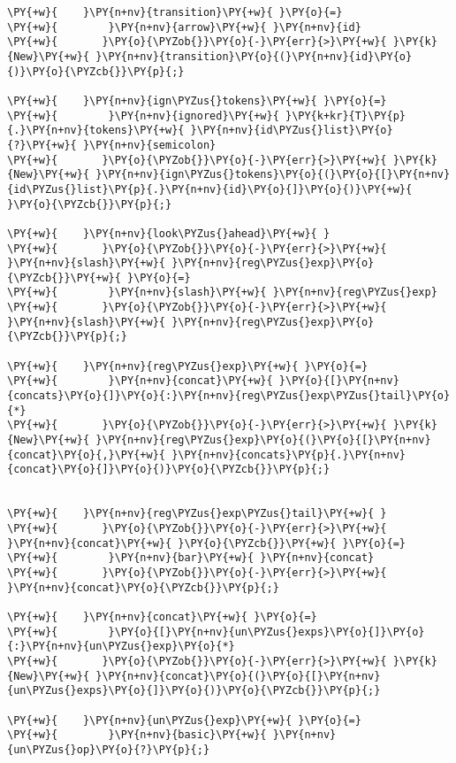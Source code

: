 \begin{Verbatim}[commandchars=\\\{\}]
\PY{+w}{    }\PY{n+nv}{transition}\PY{+w}{ }\PY{o}{=}
\PY{+w}{        }\PY{n+nv}{arrow}\PY{+w}{ }\PY{n+nv}{id}
\PY{+w}{	   }\PY{o}{\PYZob{}}\PY{o}{-}\PY{err}{>}\PY{+w}{ }\PY{k}{New}\PY{+w}{ }\PY{n+nv}{transition}\PY{o}{(}\PY{n+nv}{id}\PY{o}{)}\PY{o}{\PYZcb{}}\PY{p}{;}

\PY{+w}{    }\PY{n+nv}{ign\PYZus{}tokens}\PY{+w}{ }\PY{o}{=}
\PY{+w}{        }\PY{n+nv}{ignored}\PY{+w}{ }\PY{k+kr}{T}\PY{p}{.}\PY{n+nv}{tokens}\PY{+w}{ }\PY{n+nv}{id\PYZus{}list}\PY{o}{?}\PY{+w}{ }\PY{n+nv}{semicolon}
\PY{+w}{	   }\PY{o}{\PYZob{}}\PY{o}{-}\PY{err}{>}\PY{+w}{ }\PY{k}{New}\PY{+w}{ }\PY{n+nv}{ign\PYZus{}tokens}\PY{o}{(}\PY{o}{[}\PY{n+nv}{id\PYZus{}list}\PY{p}{.}\PY{n+nv}{id}\PY{o}{]}\PY{o}{)}\PY{+w}{ }\PY{o}{\PYZcb{}}\PY{p}{;}

\PY{+w}{    }\PY{n+nv}{look\PYZus{}ahead}\PY{+w}{ }
\PY{+w}{	   }\PY{o}{\PYZob{}}\PY{o}{-}\PY{err}{>}\PY{+w}{ }\PY{n+nv}{slash}\PY{+w}{ }\PY{n+nv}{reg\PYZus{}exp}\PY{o}{\PYZcb{}}\PY{+w}{ }\PY{o}{=}
\PY{+w}{        }\PY{n+nv}{slash}\PY{+w}{ }\PY{n+nv}{reg\PYZus{}exp}
\PY{+w}{	   }\PY{o}{\PYZob{}}\PY{o}{-}\PY{err}{>}\PY{+w}{ }\PY{n+nv}{slash}\PY{+w}{ }\PY{n+nv}{reg\PYZus{}exp}\PY{o}{\PYZcb{}}\PY{p}{;}

\PY{+w}{    }\PY{n+nv}{reg\PYZus{}exp}\PY{+w}{ }\PY{o}{=}
\PY{+w}{        }\PY{n+nv}{concat}\PY{+w}{ }\PY{o}{[}\PY{n+nv}{concats}\PY{o}{]}\PY{o}{:}\PY{n+nv}{reg\PYZus{}exp\PYZus{}tail}\PY{o}{*}
\PY{+w}{	   }\PY{o}{\PYZob{}}\PY{o}{-}\PY{err}{>}\PY{+w}{ }\PY{k}{New}\PY{+w}{ }\PY{n+nv}{reg\PYZus{}exp}\PY{o}{(}\PY{o}{[}\PY{n+nv}{concat}\PY{o}{,}\PY{+w}{ }\PY{n+nv}{concats}\PY{p}{.}\PY{n+nv}{concat}\PY{o}{]}\PY{o}{)}\PY{o}{\PYZcb{}}\PY{p}{;}


\PY{+w}{    }\PY{n+nv}{reg\PYZus{}exp\PYZus{}tail}\PY{+w}{ }
\PY{+w}{	   }\PY{o}{\PYZob{}}\PY{o}{-}\PY{err}{>}\PY{+w}{ }\PY{n+nv}{concat}\PY{+w}{ }\PY{o}{\PYZcb{}}\PY{+w}{ }\PY{o}{=}
\PY{+w}{        }\PY{n+nv}{bar}\PY{+w}{ }\PY{n+nv}{concat}
\PY{+w}{	   }\PY{o}{\PYZob{}}\PY{o}{-}\PY{err}{>}\PY{+w}{ }\PY{n+nv}{concat}\PY{o}{\PYZcb{}}\PY{p}{;}

\PY{+w}{    }\PY{n+nv}{concat}\PY{+w}{ }\PY{o}{=}
\PY{+w}{        }\PY{o}{[}\PY{n+nv}{un\PYZus{}exps}\PY{o}{]}\PY{o}{:}\PY{n+nv}{un\PYZus{}exp}\PY{o}{*}
\PY{+w}{	   }\PY{o}{\PYZob{}}\PY{o}{-}\PY{err}{>}\PY{+w}{ }\PY{k}{New}\PY{+w}{ }\PY{n+nv}{concat}\PY{o}{(}\PY{o}{[}\PY{n+nv}{un\PYZus{}exps}\PY{o}{]}\PY{o}{)}\PY{o}{\PYZcb{}}\PY{p}{;}

\PY{+w}{    }\PY{n+nv}{un\PYZus{}exp}\PY{+w}{ }\PY{o}{=}
\PY{+w}{        }\PY{n+nv}{basic}\PY{+w}{ }\PY{n+nv}{un\PYZus{}op}\PY{o}{?}\PY{p}{;}


\end{Verbatim}
